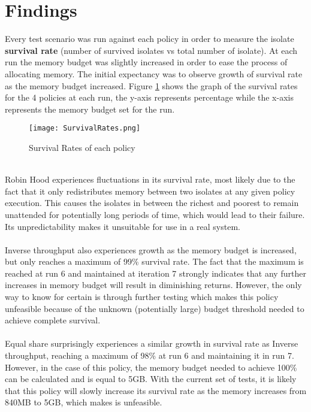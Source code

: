 \documentclass{l4proj}
\begin{document}
\section{Findings}
\hspace*{3em} Every test scenario was run against each policy in order to measure the isolate \textbf{survival rate} (number of survived isolates vs total number of isolate). At each run the memory budget was slightly increased in order to ease the process of allocating memory. The initial expectancy was to observe growth of survival rate as the memory budget increased. Figure \ref{findings} shows the graph of the survival rates for the 4 policies at each run, the y-axis represents percentage while the x-axis represents the memory budget set for the run.%
\begin{figure}[!ht]
  \centering
    \texttt{[image: SurvivalRates.png]}
    \caption{Survival Rates of each policy}
    \label{findings}
\end{figure}\\
Robin Hood experiences fluctuations in its survival rate, most likely due to the fact that it only redistributes memory between two isolates at any given policy execution. This causes the isolates in between the richest and poorest to remain unattended for potentially long  periods of time, which would lead to their failure. Its unpredictability makes it unsuitable for use in a real system.
\\\\
Inverse throughput also experiences growth as the memory budget is increased, but only reaches a maximum of 99\% survival rate. The fact that the maximum is reached at run 6 and maintained at iteration 7 strongly indicates that any further increases in memory budget will result in diminishing returns. However, the only way to know for certain is through further testing which makes this policy unfeasible because of the unknown (potentially large) budget threshold needed to achieve complete survival.
\\\\
Equal share surprisingly experiences a similar growth in survival rate as Inverse throughput, reaching a maximum of 98\% at run 6 and maintaining it in run 7. However, in the case of this policy, the memory budget needed to achieve 100\% can be calculated and is equal to 5GB. With the current set of tests, it is likely that this policy will slowly increase its survival rate as the memory increases from 840MB to 5GB, which makes is unfeasible.
\end{document}
